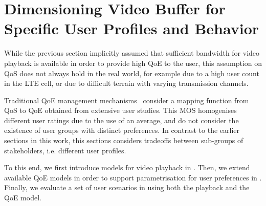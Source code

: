\section{Dimensioning Video Buffer for Specific User Profiles and Behavior}\label{sec:application:qoe_user_behaviour}

\newcommand{\stallingRatio}{\ensuremath{R}\xspace}
\newcommand{\stallingDuration}{\ensuremath{L}\xspace}
\newcommand{\numberStallingEvents}{\ensuremath{N^*}\xspace}
\newcommand{\stallingFrequency}{\ensuremath{F}\xspace}
\newcommand{\meanStallingEventDuration}{\ensuremath{L}\xspace}

\newcommand{\networkBandwidth}{\ensuremath{\lambda}\xspace}
\newcommand{\playbackRate}{\ensuremath{\mu}\xspace}

\newcommand{\meanBusy}{\ensuremath{B}\xspace}
\newcommand{\meanIdle}{\ensuremath{L}\xspace}
\newcommand{\numberFrames}{\ensuremath{Z}\xspace}
\newcommand{\videoDownloadTime}{\ensuremath{t_Z}\xspace}

\newcommand{\watchLater}{\emph{Watch Later}\xspace}
\newcommand{\watchNow}{\emph{Watch Now}\xspace}
\newcommand{\videoBrowsing}{\emph{Video Browsing}\xspace}

While the previous section implicitly assumed that sufficient bandwidth for video playback is available in order to provide high \gls{QoE} to the user, this assumption on \gls{QoS} does not always hold in the real world, for example due to a high user count in the \gls{LTE} cell, or due to difficult terrain with varying transmission channels.

Traditional \gls{QoE} management mechanisms~\cite{Hossfeld2013c} consider a mapping function from \gls{QoS} to \gls{QoE} obtained from extensive user studies.
This \gls{MOS} homogenises different user ratings due to the use of an average, and do not consider the existence of user groups with distinct preferences.
In contrast to the earlier sections in this work, this sections considers tradeoffs between sub-groups of stakeholders, i.e. different user profiles.

To this end, we first introduce models for video playback in .
Then, we extend available \gls{QoE} models in order to support parametrisation for user preferences in .
Finally, we evaluate a set of user scenarios in  using both the playback and the \gls{QoE} model.



